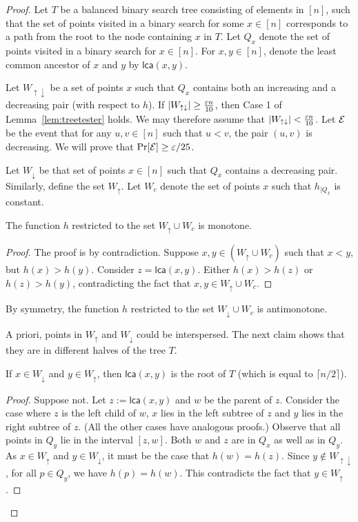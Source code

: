 \begin{proof}
\def\lca{\mathsf{lca}}
\def\updown{$\{\uparrow, \downarrow \}$}
Let $T$ be a balanced binary search tree consisting of elements in $[n]$, such that the set of points visited in a binary search for some $x \in [n]$ corresponds to a path from the root to the node containing $x$ in $T$.
Let $Q_x$ denote the set of points visited in a binary search for $x \in [n]$.
For $x, y \in [n]$, denote the least common ancestor of $x$ and $y$ by $\lca(x,y)$.

Let $W_{\uparrow \downarrow}$ be a set of points $x$ such that $Q_x$ contains both an increasing and a decreasing pair (with respect to $h$). If $|W_{\uparrow \downarrow}|\geq \frac{\varepsilon n}{10}$, then Case 1 of Lemma~\ref{lem:treetester} holds. We may therefore assume that $|W_{\uparrow \downarrow}|< \frac{\varepsilon n}{10}$.
Let ${\cal E}$ be the event that for any $u,v \in [n]$ such that $u < v$, the pair $(u,v)$ is decreasing. We will prove
that $\Pr[{\cal E}] \geq \varepsilon/25$.

Let $W_{\downarrow}$ be that set of points $x \in [n]$ such that $Q_x$
contains a decreasing pair. Similarly, define the set $W_{\uparrow}$. Let $W_c$ denote the set of points $x$ such that $h_{|Q_x}$ is constant.

\begin{claim}\label{clm:2}
	The function $h$ restricted to the set $W_{\uparrow}\cup W_c$ is monotone.
\end{claim}

\begin{proof}
The proof is by contradiction. Suppose $x,y \in (W_{\uparrow} \cup W_c)$ such that $x < y$, but $h(x) > h(y)$.
Consider $z = \lca(x,y)$. Either $h(x) > h(z)$ or $h(z) > h(y)$, contradicting
the fact that $x, y \in W_{\uparrow}\cup W_c$.
\end{proof}

\noindent By symmetry, the function $h$ restricted to the set $W_{\downarrow}\cup W_c$ is antimonotone.

A priori, points in $W_{\uparrow}$ and $W_{\downarrow}$ could be interspersed.
The next claim shows that they are in different halves of the tree $T$.

\begin{claim}\label{clm:pure}
	If $x\in W_{\downarrow}$ and $y\in W_{\uparrow}$, then $\lca(x,y)$ is the root of $T$ (which is equal to $\lceil n/2 \rceil$).
\end{claim}

\begin{proof}
	Suppose not. Let $z := \lca(x,y)$ and $w$ be the parent of $z$.
    Consider the case where $z$ is the left child of $w$,  $x$ lies in the left subtree of $z$ and $y$ lies in the right subtree of $z$.
    (All the other cases have analogous proofs.)
    Observe that all points in $Q_y$ lie in the interval $[z,w]$.
    Both $w$ and $z$ are in $Q_x$ as well as in $Q_y$.
    As $x \in W_{\uparrow}$ and $y \in W_{\downarrow}$, it must be the case that $h(w) = h(z)$.
    Since $y\notin W_{\uparrow \downarrow}$, for all $p \in Q_y$, we have $h(p) = h(w)$.
    This contradicts the fact that $y\in  W_{\uparrow}$.


\end{proof}
\end{proof}
